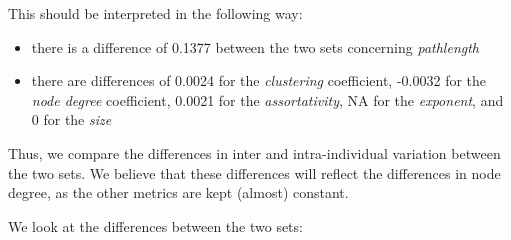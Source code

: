 \documentclass[
]{article}
\providecommand{\tightlist}{%
  \setlength{\itemsep}{0pt}\setlength{\parskip}{0pt}}
\begin{document}
This should be interpreted in the following way:

\begin{itemize}
\tightlist
\item
  there is a difference of 0.1377 between the two sets concerning
  \emph{pathlength}
\item
  there are differences of 0.0024 for the \emph{clustering} coefficient,
  -0.0032 for the \emph{node degree} coefficient, 0.0021 for the
  \emph{assortativity}, NA for the \emph{exponent}, and 0 for the
  \emph{size}
\end{itemize}

Thus, we compare the differences in inter and intra-individual variation
between the two sets. We believe that these differences will reflect the
differences in node degree, as the other metrics are kept (almost)
constant.

We look at the differences between the two sets:
\end{document}
